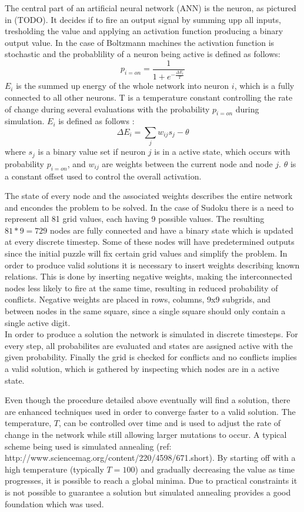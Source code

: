 \documentclass[a4paper,11pt]{kth-mag}
\begin{document}
The central part of an artificial neural network (ANN) is the neuron, as pictured in (TODO).
It decides if to fire an output signal by summing upp all inputs, tresholding the value and applying an activation function producing a binary output value.
In the case of Boltzmann machines the activation function is stochastic and the probablility of a neuron being active is defined as follows:
\[
p_{i=on} = \frac{1}{1+e^{-\frac{\Delta E_{i}}{T}}}
\]
$E_i$ is the summed up energy of the whole network into neuron $i$, which is a fully connected to all other neurons.
T is a temperature constant controlling the rate of change during several evaluations with the probability $p_{i=on}$ during simulation.
$E_i$ is defined as follows \cite{boltzmann2}:
\[
\Delta E_{i} = \sum_{j} w_{ij} s_{j} - \theta
\]
where $s_j$ is a binary value set if neuron $j$ is in a active state, which occurs with probability $p_{i=on}$, and $w_{ij}$ are weights between the current node and node $j$. $\theta$ is a constant offset used to control the overall activation.

The state of every node and the associated weights describes the entire network and encondes the problem to be solved.
In the case of Sudoku there is a need to represent all 81 grid values, each having 9 possible values.
The resulting $81*9=729$ nodes are fully connected and have a binary state which is updated at every discrete timestep.
Some of these nodes will have predetermined outputs since the initial puzzle will fix certain grid values and simplify the problem.
In order to produce valid solutions it is necessary to insert weights describing known relations.
This is done by inserting negative weights, making the interconnected nodes less likely to fire at the same time, resulting in reduced probability of conflicts.
Negative weights are placed in rows, columns, 9x9 subgrids, and between nodes in the same square, since a single square should only contain a single active digit.\\

In order to produce a solution the network is simulated in discrete timesteps.
For every step, all probabilites are evaluated and states are assigned active with the given probability.
Finally the grid is checked for conflicts and no conflicts implies a valid solution, which is gathered by inspecting which nodes are in a active state.

Even though the procedure detailed above eventually will find a solution, there are enhanced techniques used in order to converge faster to a valid solution.
The temperature, $T$, can be controlled over time and is used to adjust the rate of change in the network while still allowing larger mutations to occur.
A typical scheme being used is simulated annealing (ref: http://www.sciencemag.org/content/220/4598/671.short).
By starting off with a high temperature (typically $T = 100$) and gradually decreasing the value as time progresses, it is possible to reach a global minima.
Due to practical constraints it is not possible to guarantee a solution but simulated annealing provides a good foundation which was used.\\
\end{document}

